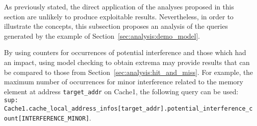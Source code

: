 \begin{example}
As previously stated, the direct application of the analyses proposed in this
section are unlikely to produce exploitable results. Nevertheless, in order to
illustrate the concepts, this subsection proposes an analysis of the queries
generated by the example of Section~\ref{sec:analysis:demo_model}.

By using counters for occurrences of potential interference and those which
had an impact, using model checking to obtain extrema may provide results
that can be compared to those from Section~\ref{sec:analysis:hit_and_miss}.
For example, the maximum number of occurrences for minor interference
related to the memory element at address \lstinline!target_addr! on Cache1, the
following query can be used:~~\\
\lstinline!sup: Cache1.cache_local_address_infos[target_addr].potential_interference_count[INTERFERENCE_MINOR]!.



\end{example}
